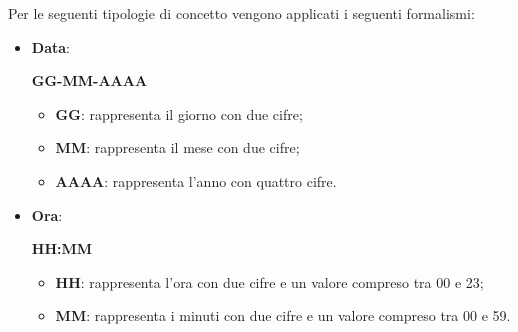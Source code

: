             Per le seguenti tipologie di concetto vengono applicati i seguenti formalismi:
                \begin{itemize}
                    \item\textbf{Data}: \begin{center}\textbf{GG-MM-AAAA}\end{center}
                        \begin{itemize}
                            \item\textbf{GG}: rappresenta il giorno con due cifre;
                            \item\textbf{MM}: rappresenta il mese con due cifre;
                            \item\textbf{AAAA}: rappresenta l'anno con quattro cifre.
                        \end{itemize}
                    \item\textbf{Ora}: \begin{center}\textbf{HH:MM}\end{center}
                        \begin{itemize}
                            \item\textbf{HH}: rappresenta l'ora con due cifre e un valore compreso tra 00 e 23;
                            \item\textbf{MM}: rappresenta i minuti con due cifre e un valore compreso tra 00 e 59.
                        \end{itemize}
                \end{itemize}


